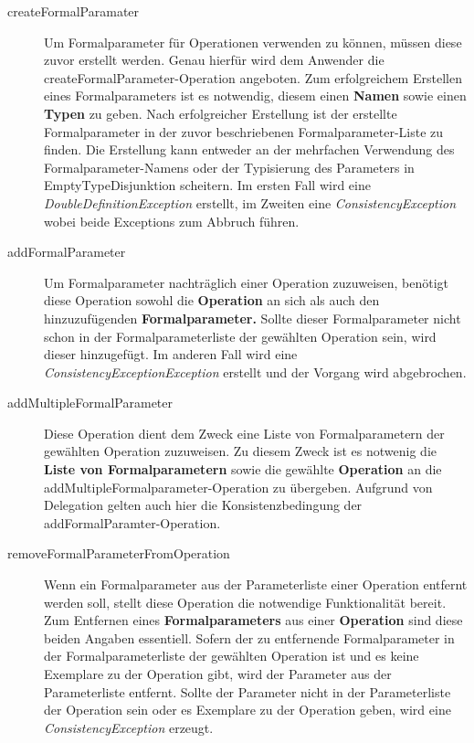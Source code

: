 \begin{description}
\item[createFormalParamater]
Um Formalparameter für Operationen verwenden zu können, müssen diese zuvor erstellt werden. Genau hierfür wird dem Anwender die createFormalParameter-Operation angeboten.
Zum erfolgreichem Erstellen eines Formalparameters ist es notwendig, diesem einen \textbf{Namen} sowie einen \textbf{Typen} zu geben. Nach erfolgreicher Erstellung ist der erstellte Formalparameter in der zuvor beschriebenen Formalparameter-Liste zu finden. Die Erstellung kann entweder an der mehrfachen Verwendung des Formalparameter-Namens oder der Typisierung des Parameters in EmptyTypeDisjunktion scheitern. Im ersten Fall wird eine \emph{DoubleDefinitionException} erstellt, im Zweiten eine \emph{ConsistencyException} wobei beide Exceptions zum Abbruch führen.
\item[addFormalParameter]
Um Formalparameter nachträglich einer Operation zuzuweisen, benötigt diese Operation sowohl die \textbf{Operation} an sich als auch den hinzuzufügenden \textbf{Formalparameter.} Sollte dieser Formalparameter nicht schon in der Formalparameterliste der gewählten Operation sein, wird dieser hinzugefügt. Im anderen Fall wird eine \emph{ConsistencyExceptionException} erstellt und der Vorgang wird abgebrochen.
\item[addMultipleFormalParameter]
Diese Operation dient dem Zweck eine Liste von Formalparametern der gewählten Operation zuzuweisen.
Zu diesem Zweck ist es notwenig die \textbf{Liste von Formalparametern} sowie 
die gewählte \textbf{Operation} an die addMultipleFormalparameter-Operation zu übergeben. 
Aufgrund von Delegation gelten auch hier die Konsistenzbedingung der addFormalParamter-Operation. 
\item[removeFormalParameterFromOperation]
Wenn ein Formalparameter aus der Parameterliste einer Operation entfernt werden soll, stellt diese Operation die notwendige Funktionalität bereit. Zum Entfernen eines \textbf{Formalparameters} aus einer \textbf{Operation} sind diese beiden Angaben essentiell. Sofern der zu entfernende Formalparameter in der Formalparameterliste der gewählten Operation ist und es keine Exemplare zu der Operation gibt, wird der Parameter aus der Parameterliste entfernt.
Sollte der Parameter nicht in der Parameterliste der Operation sein oder es Exemplare zu der Operation geben, wird eine \emph{ConsistencyException} erzeugt.


\end{description}
